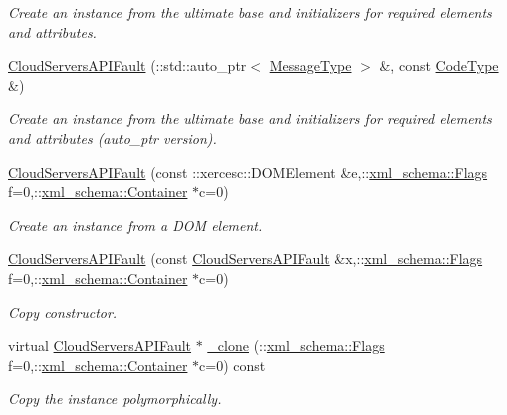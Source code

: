 \begin{DoxyCompactItemize}
\begin{DoxyCompactList}\small\item\em Create an instance from the ultimate base and initializers for required elements and attributes. \item\end{DoxyCompactList}\item 
\hyperlink{classopenstack_1_1xml_1_1CloudServersAPIFault_a819055e96c127dfb362b0e82316f48fd}{CloudServersAPIFault} (::std::auto\_\-ptr$<$ \hyperlink{classopenstack_1_1xml_1_1CloudServersAPIFault_aff7b9d2067747fa033a0ea4408011af6}{MessageType} $>$ \&, const \hyperlink{classopenstack_1_1xml_1_1CloudServersAPIFault_aa9f350c9dba08ae375b2a61568551550}{CodeType} \&)
\begin{DoxyCompactList}\small\item\em Create an instance from the ultimate base and initializers for required elements and attributes (auto\_\-ptr version). \item\end{DoxyCompactList}\item 
\hyperlink{classopenstack_1_1xml_1_1CloudServersAPIFault_a944b4a7c7f6d64758472e60087639808}{CloudServersAPIFault} (const ::xercesc::DOMElement \&e,::\hyperlink{namespacexml__schema_affb4c227cbd9aa7453dd1dc5a1401943}{xml\_\-schema::Flags} f=0,::\hyperlink{namespacexml__schema_a333dea2213742aea47a37532dec4ec27}{xml\_\-schema::Container} $\ast$c=0)
\begin{DoxyCompactList}\small\item\em Create an instance from a DOM element. \item\end{DoxyCompactList}\item 
\hyperlink{classopenstack_1_1xml_1_1CloudServersAPIFault_a303cf1855e94cdbf654eb75c6ed2b341}{CloudServersAPIFault} (const \hyperlink{classopenstack_1_1xml_1_1CloudServersAPIFault}{CloudServersAPIFault} \&x,::\hyperlink{namespacexml__schema_affb4c227cbd9aa7453dd1dc5a1401943}{xml\_\-schema::Flags} f=0,::\hyperlink{namespacexml__schema_a333dea2213742aea47a37532dec4ec27}{xml\_\-schema::Container} $\ast$c=0)
\begin{DoxyCompactList}\small\item\em Copy constructor. \item\end{DoxyCompactList}\item 
virtual \hyperlink{classopenstack_1_1xml_1_1CloudServersAPIFault}{CloudServersAPIFault} $\ast$ \hyperlink{classopenstack_1_1xml_1_1CloudServersAPIFault_a29ace5d37cf3fd9b457e2aa968079505}{\_\-clone} (::\hyperlink{namespacexml__schema_affb4c227cbd9aa7453dd1dc5a1401943}{xml\_\-schema::Flags} f=0,::\hyperlink{namespacexml__schema_a333dea2213742aea47a37532dec4ec27}{xml\_\-schema::Container} $\ast$c=0) const 
\begin{DoxyCompactList}\small\item\em Copy the instance polymorphically. \item\end{DoxyCompactList}\end{DoxyCompactItemize}


